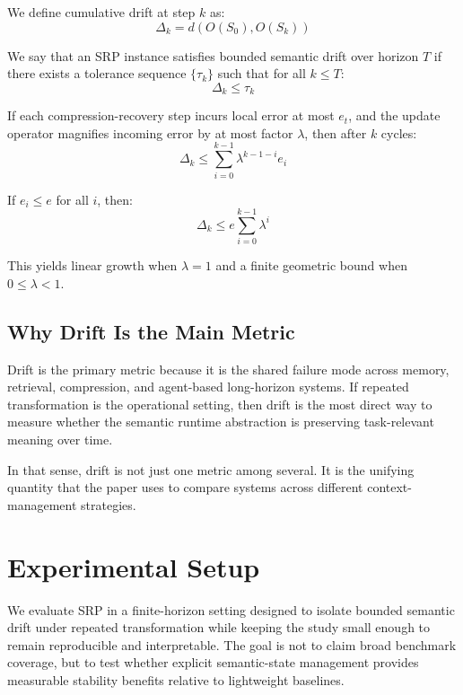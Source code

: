 \documentclass{article}
\begin{document}
We define cumulative drift at step $k$ as:
\begin{equation}
\Delta_k = d(O(S_0), O(S_k))
\end{equation}

We say that an SRP instance satisfies bounded semantic drift over horizon $T$ if there exists a tolerance sequence $\{\tau_k\}$ such that for all $k \le T$:
\begin{equation}
\Delta_k \le \tau_k
\end{equation}

If each compression-recovery step incurs local error at most $e_t$, and the update operator magnifies incoming error by at most factor $\lambda$, then after $k$ cycles:
\begin{equation}
\Delta_k \le \sum_{i=0}^{k-1} \lambda^{k-1-i} e_i
\end{equation}

If $e_i \le e$ for all $i$, then:
\begin{equation}
\Delta_k \le e \sum_{i=0}^{k-1} \lambda^i
\end{equation}

This yields linear growth when $\lambda = 1$ and a finite geometric bound when $0 \le \lambda < 1$.

\subsection{Why Drift Is the Main Metric}

Drift is the primary metric because it is the shared failure mode across memory, retrieval, compression, and agent-based long-horizon systems. If repeated transformation is the operational setting, then drift is the most direct way to measure whether the semantic runtime abstraction is preserving task-relevant meaning over time.

In that sense, drift is not just one metric among several. It is the unifying quantity that the paper uses to compare systems across different context-management strategies.

\section{Experimental Setup}
We evaluate SRP in a finite-horizon setting designed to isolate bounded semantic drift under repeated transformation while keeping the study small enough to remain reproducible and interpretable. The goal is not to claim broad benchmark coverage, but to test whether explicit semantic-state management provides measurable stability benefits relative to lightweight baselines.
\end{document}
